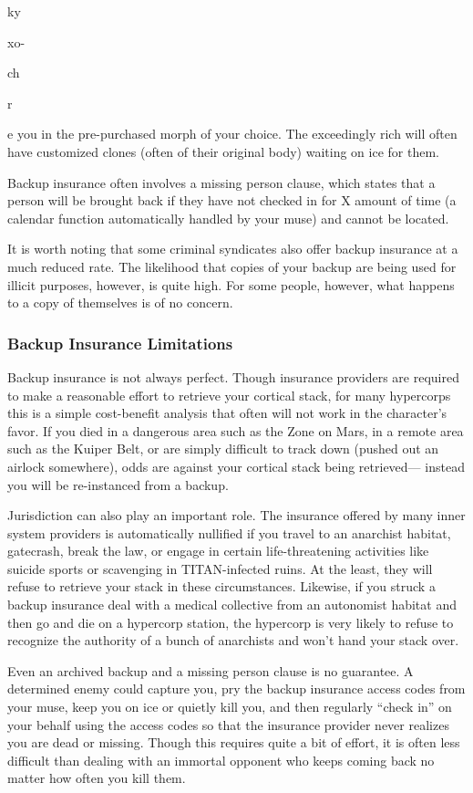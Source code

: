 ky 

xo-

ch 

r 

e
you in the pre-purchased morph of your choice. The 
exceedingly rich will often have customized clones 
(often of their original body) waiting on ice for them.

Backup insurance often involves a missing person 
clause, which states that a person will be brought 
back if they have not checked in for X amount of time 
(a calendar function automatically handled by your 
muse) and cannot be located.

It is worth noting that some criminal syndicates 
also offer backup insurance at a much reduced rate. 
The likelihood that copies of your backup are being 
used for illicit purposes, however, is quite high. For 
some people, however, what happens to a copy of 
themselves is of no concern.

\subsubsection{Backup Insurance Limitations}

Backup insurance is not always perfect. Though insurance
providers are required to make a reasonable
effort to retrieve your cortical stack, for many hypercorps
this is a simple cost-benefit analysis that often
will not work in the character's favor. If you died in a 
dangerous area such as the Zone on Mars, in a remote 
area such as the Kuiper Belt, or are simply difficult 
to track down (pushed out an airlock somewhere), 
odds are against your cortical stack being retrieved—
instead you will be re-instanced from a backup.

Jurisdiction can also play an important role. The 
insurance offered by many inner system providers is 
automatically nullified if you travel to an anarchist 
habitat, gatecrash, break the law, or engage in certain 
life-threatening activities like suicide sports or scavenging
in TITAN-infected ruins. At the least, they will
refuse to retrieve your stack in these circumstances. 
Likewise, if you struck a backup insurance deal with 
a medical collective from an autonomist habitat and 
then go and die on a hypercorp station, the hypercorp 
is very likely to refuse to recognize the authority of a 
bunch of anarchists and won't hand your stack over.

Even an archived backup and a missing person 
clause is no guarantee. A determined enemy could 
capture you, pry the backup insurance access codes 
from your muse, keep you on ice or quietly kill you, 
and then regularly ``check in'' on your behalf using 
the access codes so that the insurance provider never 
realizes you are dead or missing. Though this requires 
quite a bit of effort, it is often less difficult than dealing
with an immortal opponent who keeps coming
back no matter how often you kill them.

